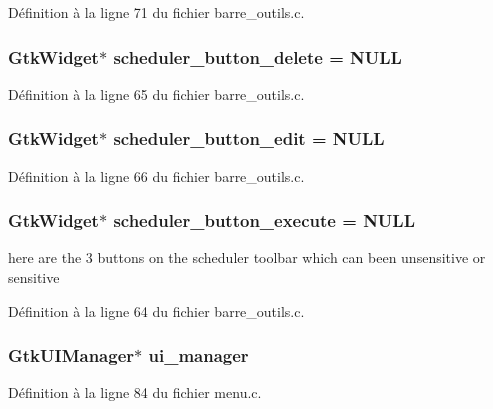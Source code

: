 Définition à la ligne 71 du fichier barre\_\-outils.c.

\subsubsection[{scheduler\_\-button\_\-delete}]{\setlength{\rightskip}{0pt plus 5cm}GtkWidget$\ast$ {\bf scheduler\_\-button\_\-delete} = NULL}\label{barre__outils_8c_a3eb48f27c4c4fe376efa3cbccab64398}


Définition à la ligne 65 du fichier barre\_\-outils.c.

\subsubsection[{scheduler\_\-button\_\-edit}]{\setlength{\rightskip}{0pt plus 5cm}GtkWidget$\ast$ {\bf scheduler\_\-button\_\-edit} = NULL}\label{barre__outils_8c_aee9c73717e42febf99a7eb6a09521f3a}


Définition à la ligne 66 du fichier barre\_\-outils.c.

\subsubsection[{scheduler\_\-button\_\-execute}]{\setlength{\rightskip}{0pt plus 5cm}GtkWidget$\ast$ {\bf scheduler\_\-button\_\-execute} = NULL}\label{barre__outils_8c_a1333bf48291dd195210eda922d5183c4}
here are the 3 buttons on the scheduler toolbar which can been unsensitive or sensitive 

Définition à la ligne 64 du fichier barre\_\-outils.c.

\subsubsection[{ui\_\-manager}]{\setlength{\rightskip}{0pt plus 5cm}GtkUIManager$\ast$ {\bf ui\_\-manager}}\label{barre__outils_8c_aa6a3b64b294a67080fe530ae293bce63}


Définition à la ligne 84 du fichier menu.c.

